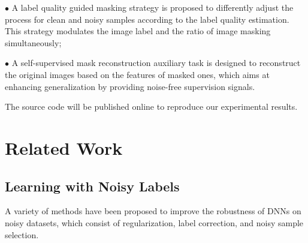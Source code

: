 \documentclass[10pt,twocolumn,letterpaper]{article}
\begin{document}
$\bullet$ A label quality guided masking strategy is proposed to {differently adjust} the process for clean and noisy samples according to the label quality estimation{. This strategy}
modulates {the image label and the ratio of image masking} simultaneously;



$\bullet$ A self-supervised mask reconstruction auxiliary {task} is designed to reconstruct the original images based on the features of masked ones, which aims at enhancing generalization by providing noise-free {supervision} signals.

The source code will be published online to reproduce our experimental results.


\section{Related Work}
\subsection{Learning with Noisy Labels}


A variety of methods have been proposed to improve the robustness of DNNs on noisy datasets, which consist of regularization, label correction, and noisy sample selection. \iffalse In this section, we briefly review existing noisy sample selection and regularization based works.\fi
\end{document}
